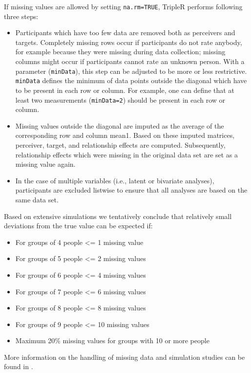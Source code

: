 \documentclass[a4paper]{article}\usepackage[]{graphicx}\usepackage[]{color}
\begin{document}
If missing values are allowed by setting \texttt{na.rm=TRUE}, TripleR performs following three steps:
\begin{itemize}

	\item Participants which have too few data are removed both as perceivers and targets. Completely missing rows occur if participants do not rate anybody, for example because they were missing during data collection; missing columns might occur if participants cannot rate an unknown person. With a parameter (\texttt{minData}), this step can be adjusted to be more or less restrictive. \texttt{minData} defines the minimum of data points outside the diagonal which have to be present in each row or column. For example, one can define that at least two measurements (\texttt{minData=2}) should be present in each row or column.

	\item Missing values outside the diagonal are imputed as the average of the corresponding row and column mean1. Based on these imputed matrices, perceiver, target, and relationship effects are computed. Subsequently, relationship effects which were missing in the original data set are set as a missing value again.
	
	\item In the case of multiple variables (i.e., latent or bivariate analyses), participants are excluded listwise to ensure that all analyses are based on the same data set.
\end{itemize}


Based on extensive simulations we tentatively conclude that relatively small deviations from the true value can be expected if: 

\begin{itemize}
	\item For groups of 4 people <= 1 missing value
	\item For groups of 5 people <= 2 missing values
	\item For groups of 6 people <= 4 missing values
	\item For groups of 7 people <= 6 missing values
	\item For groups of 8 people <= 8 missing values
	\item For groups of 9 people <= 10 missing values
	\item Maximum 20\% missing values for groups with 10 or more people
\end{itemize}

More information on the handling of missing data and simulation studies can be found in \cite{Schonbrodt_Back_Schmukle_2012}.
\end{document}
